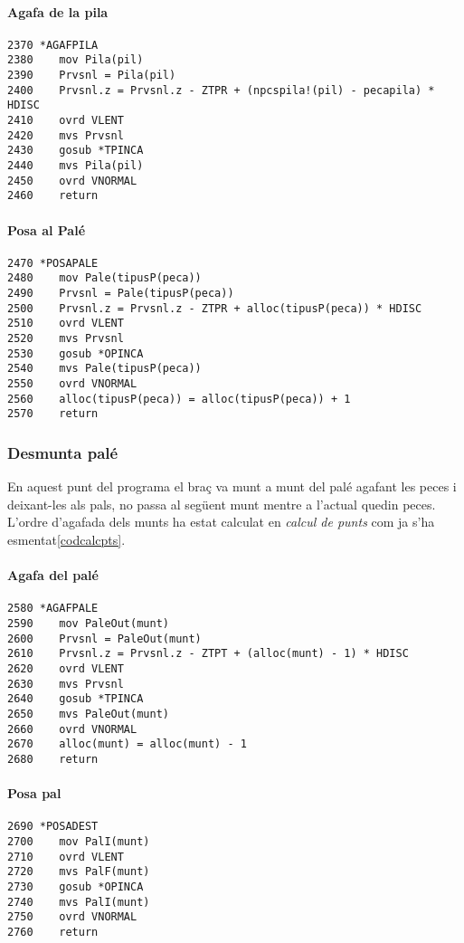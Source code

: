 \paragraph{Agafa de la pila}
\begin{verbatim}
2370 *AGAFPILA
2380    mov Pila(pil)
2390    Prvsnl = Pila(pil)
2400    Prvsnl.z = Prvsnl.z - ZTPR + (npcspila!(pil) - pecapila) * HDISC
2410    ovrd VLENT
2420    mvs Prvsnl
2430    gosub *TPINCA
2440    mvs Pila(pil)
2450    ovrd VNORMAL
2460    return
\end{verbatim}

\paragraph{Posa al Palé}
\begin{verbatim}
2470 *POSAPALE
2480    mov Pale(tipusP(peca))
2490    Prvsnl = Pale(tipusP(peca))
2500    Prvsnl.z = Prvsnl.z - ZTPR + alloc(tipusP(peca)) * HDISC
2510    ovrd VLENT
2520    mvs Prvsnl
2530    gosub *OPINCA
2540    mvs Pale(tipusP(peca))
2550    ovrd VNORMAL
2560    alloc(tipusP(peca)) = alloc(tipusP(peca)) + 1
2570    return
\end{verbatim}

\subsubsection{Desmunta palé}
En aquest punt del programa el braç va munt a munt del palé agafant les peces
i deixant-les als pals, no passa al següent munt mentre a l'actual quedin peces.
L'ordre d'agafada dels munts ha estat calculat en \emph{calcul de punts} com ja s'ha
esmentat\ref{codcalcpts}.

\paragraph{Agafa del palé}
\begin{verbatim}
2580 *AGAFPALE
2590    mov PaleOut(munt)
2600    Prvsnl = PaleOut(munt)
2610    Prvsnl.z = Prvsnl.z - ZTPT + (alloc(munt) - 1) * HDISC
2620    ovrd VLENT
2630    mvs Prvsnl
2640    gosub *TPINCA
2650    mvs PaleOut(munt)
2660    ovrd VNORMAL
2670    alloc(munt) = alloc(munt) - 1
2680    return
\end{verbatim}


\paragraph{Posa pal}
\begin{verbatim}
2690 *POSADEST
2700    mov PalI(munt)
2710    ovrd VLENT
2720    mvs PalF(munt)
2730    gosub *OPINCA
2740    mvs PalI(munt)
2750    ovrd VNORMAL
2760 	return
\end{verbatim}

